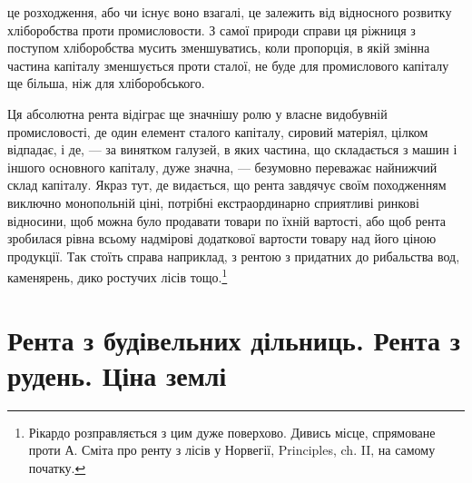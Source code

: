 \parcont{}  %
це розходження, або чи існує воно взагалі, це залежить від відносного розвитку хліборобства
проти промисловости. З самої природи справи ця ріжниця з поступом
хліборобства мусить зменшуватись, коли пропорція, в якій змінна частина
капіталу зменшується проти сталої, не буде для промислового капіталу ще
більша, ніж для хліборобського.

Ця абсолютна рента відіграє ще значнішу ролю у власне видобувній
промисловості, де один елемент сталого капіталу, сировий матеріял, цілком відпадає,
і де, — за винятком галузей, в яких частина, що складається з машин і
іншого основного капіталу, дуже значна, — безумовно переважає найнижчий
склад капіталу. Якраз тут, де видається, що рента завдячує своїм походженням
виключно монопольній ціні, потрібні екстраординарно сприятливі ринкові відносини,
щоб можна було продавати товари по їхній вартості, або щоб рента
зробилася рівна всьому надмірові додаткової вартости товару над його ціною
продукції. Так стоїть справа наприклад, з рентою з придатних до рибальства
вод, каменярень, дико ростучих лісів тощо.\footnote{
Рікардо розправляється з цим дуже поверхово. Дивись місце, спрямоване проти А. Сміта
про ренту з лісів у Норвегії, Principles, ch. II, на самому початку.
}

\section{Рента з будівельних дільниць. Рента з рудень. Ціна землі}

